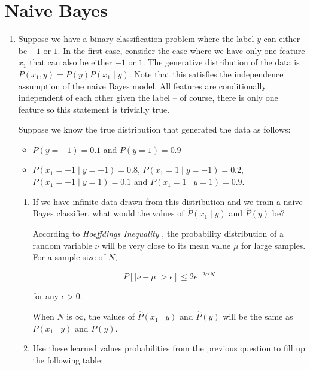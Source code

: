 \section{Naive Bayes}

\newcommand{\ph}{\hat{P}}

\begin{enumerate}
\item \relax[Part 1] Suppose we have a binary classification problem
  where the label $y$ can either be $-1$ or $1$. In the first case,
  consider the case where we have only one feature $x_1$ that can also
  be either $-1$ or $1$. The generative distribution of the data is
  $P(x_1, y) = P(y) P(x_1 \mid y)$. Note that this satisfies the
  independence assumption of the naive Bayes model. All features are
  conditionally independent of each other given the label -- of
  course, there is only one feature so this statement is trivially
  true.

  Suppose we know the true distribution that generated the data as
  follows:

  \begin{itemize}
  \item $P(y = -1) = 0.1$ and $P(y = 1) = 0.9$
  \item $P(x_1 = -1 \mid y = -1) = 0.8$, $P(x_1 = 1 \mid y = -1) = 0.2$, $P(x_1 = -1 \mid y = 1) = 0.1$ and $P(x_1 = 1 \mid y = 1) = 0.9$.
  \end{itemize}

  \begin{enumerate}
  \item \relax[2 points] If we have infinite data drawn from this
    distribution and we train a naive Bayes classifier, what would the
    values of $\ph(x_1 \mid y)$ and $\ph(y)$ be?
    
According to \textit{Hoeffdings Inequality} \cite{AMLBook}, the probability distribution of a random variable $\nu$ will be very close to its mean value $\mu$ for large samples. For a sample size of $N$, 

$$
P \left [ |\nu - \mu| > \epsilon \right ] \leq 2 e ^ {-2\epsilon^2N}
$$

for any $\epsilon > 0$.

When $N$ is $\infty$, the values of $\ph(x_1 \mid y)$ and $\ph(y)$ will be the same as $P(x_1 \mid y)$ and $P(y)$.
    
  \item \relax[6 points] Use these learned values probabilities from
    the previous question to fill up the following table:


\end{enumerate}
\end{enumerate}
